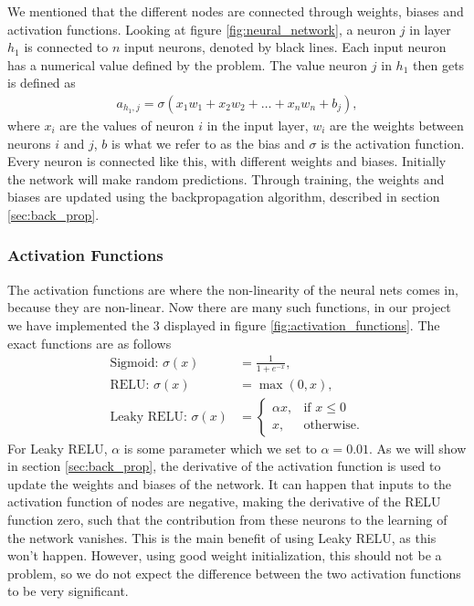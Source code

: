 \documentclass[12pt]{extarticle}
\begin{document}
We mentioned that the different nodes are connected through weights, biases and activation functions. Looking at figure \ref{fig:neural_network}, a neuron $j$ in layer $h_1$ is connected to $n$ input neurons, denoted by black lines. Each input neuron has a numerical value defined by the problem. The value neuron $j$ in $h_1$ then gets is defined as
\begin{align}
	a_{h_1, j} = \sigma (x_1w_1 + x_2w_2 + \dots + x_nw_n + b_j),
\end{align}
where $x_i$ are the values of neuron $i$ in the input layer, $w_i$ are the weights between neurons $i$ and $j$, $b$ is what we refer to as the bias and $\sigma$ is the activation function. Every neuron is connected like this, with different weights and biases. Initially the network will make random predictions. Through training, the weights and biases are updated using the backpropagation algorithm, described in section \ref{sec:back_prop}.

\subsubsection{Activation Functions}\label{sec:teo:act_funcs}
The activation functions are where the non-linearity of the neural nets comes in, because they are non-linear. Now there are many such functions, in our project we have implemented the 3 displayed in figure \ref{fig:activation_functions}. The exact functions are as follows
\begin{align}
	\text{Sigmoid: }\sigma(x)    & = \frac{1}{1 + e^{-x}},\label{eq:sigmoid}          \\
	\text{RELU: }\sigma(x)       & = \max(0,x), \label{eq:RELU}                       \\
	\text{Leaky RELU: }\sigma(x) & = \begin{cases}
		\alpha x, & \text{if } x\leq 0 \\
		x,        & \text{otherwise}.
	\end{cases} \label{eq:leaky_RELU}
\end{align}
For Leaky RELU, $\alpha$ is some parameter which we set to $\alpha = 0.01$. As we will show in section \ref{sec:back_prop}, the derivative of the activation function is used to update the weights and biases of the network. It can happen that inputs to the activation function of nodes are negative, making the derivative of the RELU function zero, such that the contribution from these neurons to the learning of the network vanishes. This is the main benefit of using Leaky RELU, as this won't happen. However, using good weight initialization, this should not be a problem, so we do not expect the difference between the two activation functions to be very significant.
\end{document}
